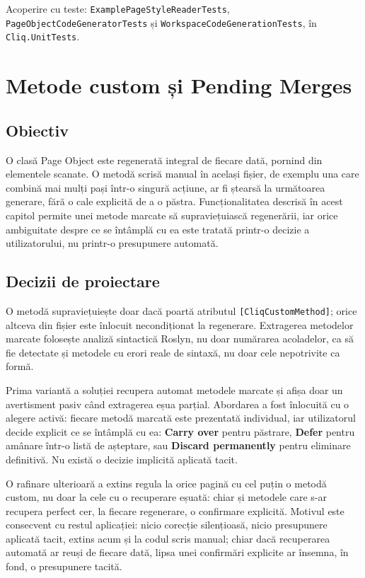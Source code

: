 \documentclass[12pt,a4paper]{report}
\newcommand{\UI}[1]{\textbf{#1}}
\newcommand{\File}[1]{\nolinkurl{#1}}
\begin{document}
Acoperire cu teste: \File{ExamplePageStyleReaderTests}, \File{PageObjectCodeGeneratorTests} și \File{WorkspaceCodeGenerationTests}, în \File{Cliq.UnitTests}.

\chapter{Metode custom și Pending Merges}

\section{Obiectiv}

O clasă Page Object este regenerată integral de fiecare dată, pornind din elementele scanate. O metodă scrisă manual în același fișier, de exemplu una care combină mai mulți pași într-o singură acțiune, ar fi ștearsă la următoarea generare, fără o cale explicită de a o păstra. Funcționalitatea descrisă în acest capitol permite unei metode marcate să supraviețuiască regenerării, iar orice ambiguitate despre ce se întâmplă cu ea este tratată printr-o decizie a utilizatorului, nu printr-o presupunere automată.

\section{Decizii de proiectare}

O metodă supraviețuiește doar dacă poartă atributul \File{[CliqCustomMethod]}; orice altceva din fișier este înlocuit necondiționat la regenerare. Extragerea metodelor marcate folosește analiză sintactică Roslyn, nu doar numărarea acoladelor, ca să fie detectate și metodele cu erori reale de sintaxă, nu doar cele nepotrivite ca formă.

Prima variantă a soluției recupera automat metodele marcate și afișa doar un avertisment pasiv când extragerea eșua parțial. Abordarea a fost înlocuită cu o alegere activă: fiecare metodă marcată este prezentată individual, iar utilizatorul decide explicit ce se întâmplă cu ea: \UI{Carry over} pentru păstrare, \UI{Defer} pentru amânare într-o listă de așteptare, sau \UI{Discard permanently} pentru eliminare definitivă. Nu există o decizie implicită aplicată tacit.

O rafinare ulterioară a extins regula la orice pagină cu cel puțin o metodă custom, nu doar la cele cu o recuperare eșuată: chiar și metodele care s-ar recupera perfect cer, la fiecare regenerare, o confirmare explicită. Motivul este consecvent cu restul aplicației: nicio corecție silențioasă, nicio presupunere aplicată tacit, extins acum și la codul scris manual; chiar dacă recuperarea automată ar reuși de fiecare dată, lipsa unei confirmări explicite ar însemna, în fond, o presupunere tacită.
\end{document}
